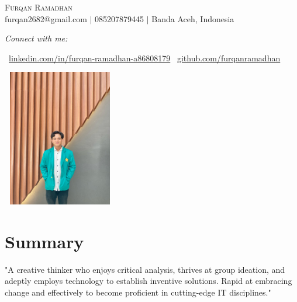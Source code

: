 \documentclass[letterpaper,10pt]{article}
\begin{document}
\hypersetup{
    linkcolor=blue,
    urlcolor=blue,
    linkbordercolor=blue,
    citebordercolor=blue
}

\begin{center}
  {\huge\scshape Furqan Ramadhan} \\ \vspace{5pt}
  furqan2682@gmail.com $|$ 085207879445 $|$ Banda Aceh, Indonesia \\
  \vspace{10pt}
  \begin{minipage}{0.4\textwidth}
    \centering
    \textit{Connect with me:} \\
    \vspace{5pt}
    \begin{minipage}{0.6\textwidth}
    \raggedright
    \hbox{\href{https://www.linkedin.com/in/furqan-ramadhan-a86808179}{\color{blue}\faLinkedin}~\href{https://www.linkedin.com/in/furqan-ramadhan-a86808179}{linkedin.com/in/furqan-ramadhan-a86808179}}
    \href{https://github.com/furqanramadhan}{\color{black}\faGithub}~\href{https://github.com/furqanramadhan}{github.com/furqanramadhan}
    \end{minipage}
  \end{minipage}%
  \begin{minipage}[r]{0.5\textwidth}
    \raggedleft
    \includegraphics[width=5cm, height=6cm]{public/img/img_01.jpeg}
  \end{minipage}
\end{center}

\section{Summary}

"A creative thinker who enjoys critical analysis, thrives at group ideation, and adeptly employs technology to establish inventive solutions. Rapid at embracing change and effectively to become proficient in cutting-edge IT disciplines."
\end{document}
